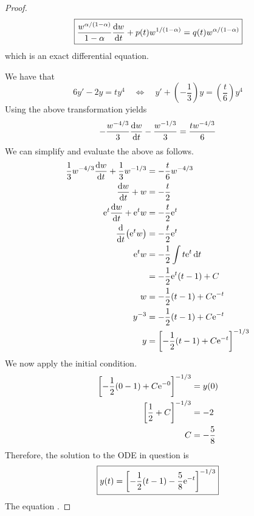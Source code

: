 \documentclass[../psets.tex]{subfiles}
\begin{document}
\begin{enumerate}
\begin{proof}
\begin{equation*}
            \boxed{\frac{w^{\alpha/(1-\alpha)}}{1-\alpha}\dv{w}{t}+p(t)w^{1/(1-\alpha)} = q(t)w^{\alpha/(1-\alpha)}}
        \end{equation*}
        which is an exact differential equation.\par
        We have that
        \begin{equation*}
            6y'-2y = ty^4
            \quad\Longleftrightarrow\quad
            y'+\left( -\frac{1}{3} \right)y = \left( \frac{t}{6} \right)y^4
        \end{equation*}
        Using the above transformation yields
        \begin{equation*}
            -\frac{w^{-4/3}}{3}\dv{w}{t}-\frac{w^{-1/3}}{3} = \frac{tw^{-4/3}}{6}
        \end{equation*}
        We can simplify and evaluate the above as follows.
        \begin{align*}
            \frac{1}{3}w^{-4/3}\dv{w}{t}+\frac{1}{3}w^{-1/3} &= -\frac{t}{6}w^{-4/3}\\
            \dv{w}{t}+w &= -\frac{t}{2}\\
            \e[t]\dv{w}{t}+\e[t]w &= -\frac{t}{2}\e[t]\\
            \dv{t}(\e[t]w) &= -\frac{t}{2}\e[t]\\
            \e[t]w &= -\frac{1}{2}\int t\e[t]\dd{t}\\
            &= -\frac{1}{2}\e[t](t-1)+C\\
            w &= -\frac{1}{2}(t-1)+C\e[-t]\\
            y^{-3} &= -\frac{1}{2}(t-1)+C\e[-t]\\
            y &= \left[ -\frac{1}{2}(t-1)+C\e[-t] \right]^{-1/3}
        \end{align*}
        We now apply the initial condition.
        \begin{align*}
            \left[ -\frac{1}{2}(0-1)+C\e[-0] \right]^{-1/3} &= y(0)\\
            \left[ \frac{1}{2}+C \right]^{-1/3} &= -2\\
            C &= -\frac{5}{8}
        \end{align*}
        Therefore, the solution to the ODE in question is
        \begin{equation*}
            \boxed{y(t) = \left[ -\frac{1}{2}(t-1)-\frac{5}{8}\e[-t] \right]^{-1/3}}
        \end{equation*}
        The equation .
    \end{proof}

\end{enumerate}
\end{document}
